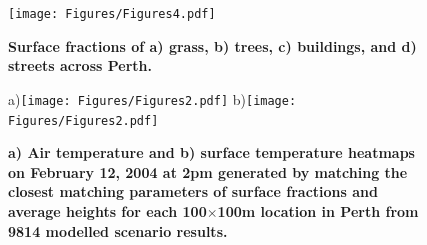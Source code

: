 \documentclass[final,3p,times,authoryear]{elsarticle}
\begin{document}
\begin{figure}
\centering
\texttt{[image: Figures/Figures4.pdf]}
\caption{\bf Surface fractions of a) grass, b) trees, c) buildings, and d) streets across Perth.}
 \label{fig:pertfracs}
\end{figure}


\begin{figure}
\centering
a)\texttt{[image: Figures/Figures2.pdf]}
b)\texttt{[image: Figures/Figures2.pdf]}
\caption{\bf a) Air temperature and b) surface temperature heatmaps on February 12, 2004 at 2pm generated by matching the closest matching parameters of surface fractions and average heights for each 100$\times$100m location in Perth from 9814 modelled scenario results.  }
 \label{fig:TaPerth}\label{fig:TsfcPerth}
\end{figure}
\end{document}
